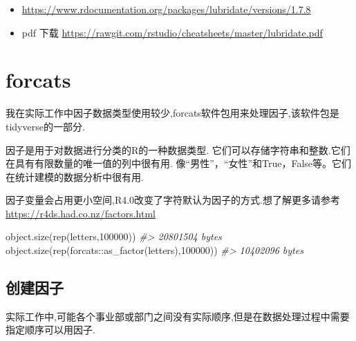 \documentclass[
]{book}
\newenvironment{Shaded}{\begin{snugshade}}{\end{snugshade}}
\newcommand{\CommentTok}[1]{\textcolor[rgb]{0.56,0.35,0.01}{\textit{#1}}}
\newcommand{\DecValTok}[1]{\textcolor[rgb]{0.00,0.00,0.81}{#1}}
\newcommand{\FunctionTok}[1]{\textcolor[rgb]{0.00,0.00,0.00}{#1}}
\newcommand{\NormalTok}[1]{#1}
\newcommand{\SpecialCharTok}[1]{\textcolor[rgb]{0.00,0.00,0.00}{#1}}
\begin{document}
\begin{itemize}
\item
  \url{https://www.rdocumentation.org/packages/lubridate/versions/1.7.8}
\item
  pdf 下载 \url{https://rawgit.com/rstudio/cheatsheets/master/lubridate.pdf}
\end{itemize}

\hypertarget{forcats}{%
\chapter{forcats}\label{forcats}}

我在实际工作中因子数据类型使用较少,forcats软件包用来处理因子,该软件包是tidyverse的一部分.

因子是用于对数据进行分类的R的一种数据类型. 它们可以存储字符串和整数.它们在具有有限数量的唯一值的列中很有用. 像``男性''，``女性''和True，False等。它们在统计建模的数据分析中很有用.

因子变量会占用更小空间,R4.0改变了字符默认为因子的方式.想了解更多请参考 \url{https://r4ds.had.co.nz/factors.html}

\begin{Shaded}
\begin{Highlighting}[]
\FunctionTok{object.size}\NormalTok{(}\FunctionTok{rep}\NormalTok{(letters,}\DecValTok{100000}\NormalTok{))}
\CommentTok{\#\textgreater{} 20801504 bytes}
\FunctionTok{object.size}\NormalTok{(}\FunctionTok{rep}\NormalTok{(forcats}\SpecialCharTok{::}\FunctionTok{as\_factor}\NormalTok{(letters),}\DecValTok{100000}\NormalTok{))}
\CommentTok{\#\textgreater{} 10402096 bytes}
\end{Highlighting}
\end{Shaded}

\hypertarget{ux521bux5efaux56e0ux5b50}{%
\section{创建因子}\label{ux521bux5efaux56e0ux5b50}}

实际工作中,可能各个事业部或部门之间没有实际顺序,但是在数据处理过程中需要指定顺序可以用因子.
\end{document}

